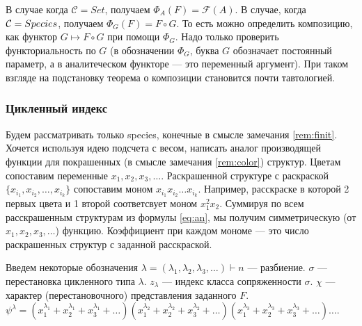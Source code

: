 В случае когда $\mathcal C = Set$, получаем
$\Phi_A(F)=\mathcal F(A)$. В случае, когда $\mathcal C = Species$, получаем
$\Phi_G(F)=F \circ G$. То есть можно определить композицию, как функтор
$G \mapsto F\circ G$ при помощи $\Phi_G$. Надо только проверить функториальность
по $G$ (в обозначении $\Phi_G$, буква $G$ обозначает постоянный параметр, а в
аналитеческом функторе --- это переменный аргумент).
При таком взгляде на подстановку теорема о композиции становится почти тавтологией.

\subsubsection{Цикленный индекс}
\label{sec:cycle}

Будем рассматривать только species, конечные в смысле замечания
\ref{rem:finit}.
Хочется используя идею подсчета с весом, написать аналог производящей функции
для покрашенных (в смысле замечания \ref{rem:color}) структур. Цветам
сопоставим переменные $x_1, x_2, x_3, \dots$. Раскрашенной структуре с
раскраской $\{x_{i_1}, x_{i_2}, \dots, x_{i_k}\}$ сопоставим моном $x_{i_1} x_{i_2} \dots x_{i_k}$.  
Например, расскраске в которой 2 первых цвета и 1 второй соответсвует моном
$x_1^2x_2$. 
Суммируя по всем расскрашенным структурам из формулы \ref{eq:an}, мы получим
симметрическую (от $x_1, x_2, x_3, \dots$) функцию. Коэффициент
при каждом мономе --- это число раскрашенных структур с заданной расскраской. 

Введем некоторые обозначения 
$\lambda = (\lambda_1, \lambda_2, \lambda_3, \dots) \vdash n$ --- разбиение.
$\sigma$ --- перестановка цикленного типа $\lambda$. $z_\lambda$ --- индекс
класса сопряженности $\sigma$.
$\chi$ --- характер (перестановочного) представления заданного $F$.
$\psi^{\lambda} = 
(x_1^{\lambda_1} + x_2^{\lambda_1} + x_3^{\lambda_1} + \dots)
(x_1^{\lambda_2} + x_2^{\lambda_2} + x_3^{\lambda_2} + \dots)
(x_1^{\lambda_3} + x_2^{\lambda_3} + x_3^{\lambda_3} + \dots)
\dots$.

